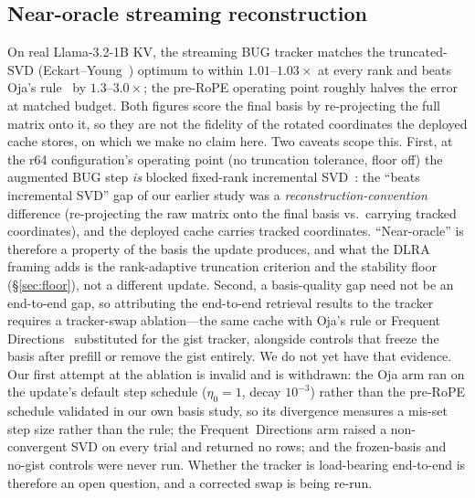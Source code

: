 \documentclass[11pt]{article}
\begin{document}
\subsection{Near-oracle streaming reconstruction}
\label{sec:oracle}
On real Llama-3.2-1B KV, the streaming BUG tracker matches the truncated-SVD
(Eckart--Young~\citep{eckart1936approximation}) optimum to within
$1.01$--$1.03\times$ at every rank and beats Oja's
rule~\citep{oja1982simplified,zhu2025ojakv} by $1.3$--$3.0\times$; the pre-RoPE
operating point roughly halves the error at matched budget. Both figures score the
final basis by re-projecting the full matrix onto it, so they are not the fidelity
of the rotated coordinates the deployed cache stores, on which we make no claim
here. Two caveats scope this. First, at the r64 configuration's operating point (no truncation tolerance, floor off)
the augmented BUG step \emph{is} blocked fixed-rank incremental
SVD~\citep{brand2006fast}: the ``beats incremental SVD'' gap of our earlier study
was a \emph{reconstruction-convention} difference (re-projecting the raw matrix onto
the final basis vs.\ carrying tracked coordinates), and the deployed cache carries
tracked coordinates. ``Near-oracle'' is therefore a property of the basis the update
produces, and what the DLRA framing adds is the rank-adaptive truncation criterion
and the stability floor (\S\ref{sec:floor}), not a different update. Second, a
basis-quality gap need not be an end-to-end gap, so attributing the end-to-end
retrieval results to the tracker requires a tracker-swap ablation---the same cache
with Oja's rule or Frequent Directions~\citep{liberty2013simple} substituted for the
gist tracker, alongside controls that freeze the basis after prefill or remove the
gist entirely. We do not yet have that evidence. Our first attempt at the ablation
is invalid and is withdrawn: the Oja arm ran on the update's default step schedule
($\eta_0{=}1$, decay $10^{-3}$) rather than the pre-RoPE schedule validated in our
own basis study, so its divergence measures a mis-set step size rather than the
rule; the Frequent~Directions arm raised a non-convergent SVD on every trial and
returned no rows; and the frozen-basis and no-gist controls were never run. Whether
the tracker is load-bearing end-to-end is therefore an open question, and a
corrected swap is being re-run.
\end{document}
